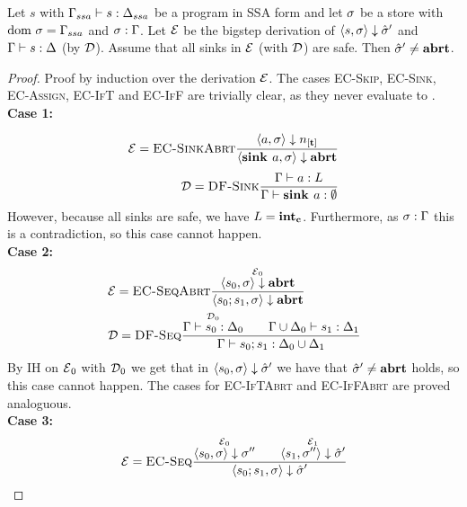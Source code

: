 \begin{lemma}
    \label{lem:df-soundness}
    Let $s$ with $\Gamma_{ssa} \vdash {s}: \Delta_{ssa}$ be a program in SSA form and let $\sigma$ be a store
    with $\text{dom }{\sigma} = \Gamma_{ssa}$ and ${\sigma}:{\Gamma}$.
    Let $\operatorname{\mathcal{E}}$ be the bigstep derivation of $\langle s, \sigma \rangle \downarrow \hat{\sigma}{}'$
    and $\Gamma \vdash {s}: \Delta$ (by $\operatorname{\mathcal{D}}$).
    Assume that all sinks in $\operatorname{\mathcal{E}}$ (with $\operatorname{\mathcal{D}}$) are safe.
    Then $\hat{\sigma}{}' \neq \textbf{abrt}$.
\end{lemma}
\begin{proof}
    Proof by induction over the derivation $\operatorname{\mathcal{E}}$.
    The cases \textsc{EC-Skip}, \textsc{EC-Sink}, \textsc{EC-Assign}, \textsc{EC-IfT} and \textsc{EC-IfF}
    are trivially clear, as they never evaluate to \exception.\\
    \textbf{Case 1:}
    \begin{align*}
        \E = \bsrule{EC-SinkAbrt}{\overset{}{\bigstep{a}{\store}{\tracked{}}}}
        {\bigstep{\defaultsink}{\store}{\exception}}\\
        \D = \trule{DF-Sink}{\overset{}{\typestep{\Gamma}{a}{L}}}
        {\typestep{\Gamma}{\sink{a}}{\emptyset}}
    \end{align*}
    However, because all sinks are safe, we have $L = \textbf{int}_\textbf{c}$.
    Furthermore, as $\sigma : \Gamma$ this is a contradiction,
    so this case cannot happen.\\
    \textbf{Case 2:}
    \begin{align*}
        &\operatorname{\mathcal{E}} = \textsc{EC-SeqAbrt}\frac{\displaystyle \overset{\operatorname{\mathcal{E}}_0}{\langle s_0, \sigma \rangle \downarrow \textbf{abrt}}}{\displaystyle \langle {s_0}; {s_1}, \sigma \rangle \downarrow \textbf{abrt}}\\
        &\operatorname{\mathcal{D}} = \textsc{DF-Seq}\frac{\displaystyle \overset{\operatorname{\mathcal{D}}_0}{\Gamma \vdash {s_0}: \Delta_0}\qquad
        \overset{}{\Gamma \cup \Delta_0 \vdash {s_1}: \Delta_1}}{\displaystyle \Gamma \vdash {{s_0}; {s_1}}: \Delta_0 \cup \Delta_1}
    \end{align*}
    By IH on $\operatorname{\mathcal{E}}_0$ with $\operatorname{\mathcal{D}}_0$ we get that in $\langle s_0, \sigma \rangle \downarrow \hat{\sigma}{}'$ 
    we have that $\hat{\sigma}{}' \neq \textbf{abrt}$ holds, so this case cannot happen.
    The cases for \textsc{EC-IfTAbrt} and \textsc{EC-IfFAbrt} are proved analoguous.\\
    \textbf{Case 3:}
    \begin{align*}
        &\E = \bsrule{EC-Seq}{\overset{\E_0}{\bigstep{s_0}{\sigma}{\store''}} \qquad 
        \overset{\E_1}{\bigstep{s_1}{\store''}{\excstore'}}}
        {\bigstep{\defaultssaseq}{\store}{\excstore'}}\\    

\end{align*}
\end{proof}
